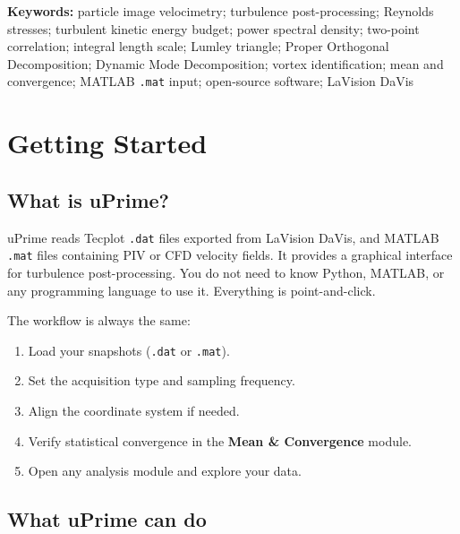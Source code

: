 \documentclass[11pt, a4paper]{report}
\newcommand{\uipth}[1]{\textbf{\textcolor{upblue}{#1}}}
\newcommand{\software}[1]{\textsf{#1}}
\begin{document}
\vspace{0.5cm}
\noindent\textbf{Keywords:} particle image velocimetry; turbulence post-processing; Reynolds stresses; turbulent kinetic energy budget; power spectral density; two-point correlation; integral length scale; Lumley triangle; Proper Orthogonal Decomposition; Dynamic Mode Decomposition; vortex identification; mean and convergence; MATLAB \texttt{.mat} input; open-source software; LaVision DaVis

\tableofcontents
\clearpage

\chapter{Getting Started}

\section{What is uPrime?}

\software{uPrime} reads Tecplot \texttt{.dat} files exported from LaVision DaVis, and MATLAB \texttt{.mat} files containing PIV or CFD velocity fields. It provides a graphical interface for turbulence post-processing. You do not need to know Python, MATLAB, or any programming language to use it. Everything is point-and-click.

The workflow is always the same:
\begin{enumerate}[leftmargin=1.5em]
  \item Load your snapshots (\texttt{.dat} or \texttt{.mat}).
  \item Set the acquisition type and sampling frequency.
  \item Align the coordinate system if needed.
  \item Verify statistical convergence in the \uipth{Mean \& Convergence} module.
  \item Open any analysis module and explore your data.
\end{enumerate}

\section{What uPrime can do}
\end{document}
